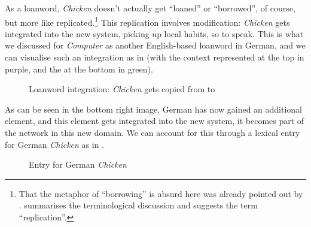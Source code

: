 As a loanword, \textit{Chicken} doesn’t actually get “loaned” or “borrowed”, of course, but more like replicated.\footnote{That the metaphor of “borrowing” is absurd here was already pointed out by \citet{Haugen1950}. \citet[Ch.6.1.]{Matras2020} summarises the terminological discussion and suggests the term “replication”.} This replication involves modification: \textit{Chicken} gets integrated into the new system, picking up local habits, so to speak. This is what we discussed for \textit{Computer} as another English-based loanword in German, and we can visualise such an integration as in  (with the  context represented at the top in purple, and the  at the bottom in green).

\begin{figure}[H]
\caption{Loanword integration: \textit{Chicken} gets copied from
 to }
\label{fig:6}
\end{figure}

As can be seen in the bottom right image, German has now gained an additional element, and this element gets integrated into the new system, it becomes part of the network in this new domain. We can account for this through a lexical entry for German \textit{Chicken} as in .

\begin{figure}
\caption{Entry for German \textit{Chicken}}
\label{fig:7}
\end{figure}

